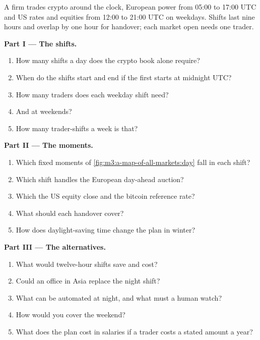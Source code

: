 \begin{problem}\label{pb:m3:a-map-of-all-markets:1}
A firm trades crypto around the clock, European power from 05:00 to 17:00 UTC and US rates and equities from 12:00 to 21:00 UTC on weekdays. Shifts last nine
hours and overlap by one hour for handover; each market open needs one trader.

\medskip\noindent\textbf{Part I --- The shifts.}
\begin{enumerate}
\item How many shifts a day does the crypto book alone require?
\item When do the shifts start and end if the first starts at midnight UTC?
\item How many traders does each weekday shift need?
\item And at weekends?
\item How many trader-shifts a week is that?
\end{enumerate}

\medskip\noindent\textbf{Part II --- The moments.}
\begin{enumerate}[resume]
\item Which fixed moments of \cref{fig:m3:a-map-of-all-markets:day} fall in each shift?
\item Which shift handles the European day-ahead auction?
\item Which the US equity close and the bitcoin reference rate?
\item What should each handover cover?
\item How does daylight-saving time change the plan in winter?
\end{enumerate}

\medskip\noindent\textbf{Part III --- The alternatives.}
\begin{enumerate}[resume]
\item What would twelve-hour shifts save and cost?
\item Could an office in Asia replace the night shift?
\item What can be automated at night, and what must a human watch?
\item How would you cover the weekend?
\item What does the plan cost in salaries if a trader costs a stated amount a year?
\end{enumerate}


\end{problem}
